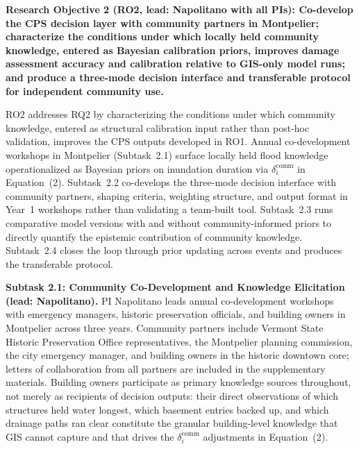 \documentclass[11pt]{article}
\begin{document}
\vspace{5pt}
\begin{tcolorbox}[colback=mycmykcolor,colframe=black,boxrule=1pt,coltext=black,
  left=1mm,right=1mm,top=1mm,bottom=1mm]
\textbf{Research Objective 2 (RO2, lead: Napolitano with all PIs): Co-develop
the CPS decision layer with community partners in Montpelier; characterize the
conditions under which locally held community knowledge, entered as Bayesian
calibration priors, improves damage assessment accuracy and calibration relative
to GIS-only model runs; and produce a three-mode decision interface and
transferable protocol for independent community use.}
\end{tcolorbox}

RO2 addresses RQ2 by characterizing the conditions under which community knowledge,
entered as structural calibration input rather than post-hoc validation, improves
the CPS outputs developed in RO1.
Annual co-development workshops in Montpelier (Subtask~2.1) surface locally held
flood knowledge operationalized as Bayesian priors on inundation duration via
$\delta_i^{\mathrm{comm}}$ in Equation~(2).
Subtask~2.2 co-develops the three-mode decision interface with community partners,
shaping criteria, weighting structure, and output format in Year~1 workshops rather
than validating a team-built tool.
Subtask~2.3 runs comparative model versions with and without community-informed
priors to directly quantify the epistemic contribution of community knowledge.
Subtask~2.4 closes the loop through prior updating across events and produces the
transferable protocol.

\textbf{Subtask 2.1: Community Co-Development and Knowledge Elicitation
(lead: Napolitano).}
PI Napolitano leads annual co-development workshops with emergency managers, historic
preservation officials, and building owners in Montpelier across three years.
Community partners include Vermont State Historic Preservation Office representatives,
the Montpelier planning commission, the city emergency manager, and building owners
in the historic downtown core; letters of collaboration from all partners are included
in the supplementary materials.
Building owners participate as primary knowledge sources throughout, not merely as
recipients of decision outputs: their direct observations of which structures held
water longest, which basement entries backed up, and which drainage paths ran clear
constitute the granular building-level knowledge that GIS cannot capture and that
drives the $\delta_i^{\mathrm{comm}}$ adjustments in Equation~(2).
\end{document}
